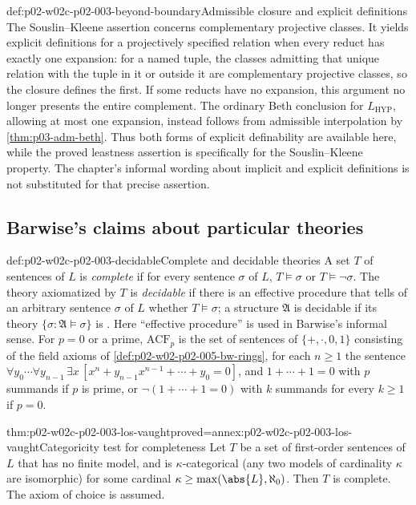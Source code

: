 \begin{hbconvention}{def:p02-w02c-p02-003-beyond-boundary}{Admissible closure and explicit definitions}
The Souslin--Kleene assertion concerns complementary projective classes.
It yields explicit definitions for a projectively specified relation
when every reduct has exactly one expansion: for a named tuple, the
classes admitting that unique relation with the tuple in it or outside
it are complementary projective classes, so the closure defines the
first. If some reducts have no expansion, this argument no longer
presents the entire complement. The ordinary Beth conclusion for
\(L_{\mathrm{HYP}}\), allowing at most one expansion, instead follows
from admissible interpolation by \cref{thm:p03-adm-beth}. Thus both
forms of explicit definability are available here, while the proved
leastness assertion is specifically for the Souslin--Kleene property.
The chapter's informal wording about implicit and explicit definitions
is not substituted for that precise assertion.
\end{hbconvention}

\subsection{Barwise's claims about particular theories}
\label{sec:p02-w02c-p02-003-theories}

\begin{hbdefinition}{def:p02-w02c-p02-003-decidable}{Complete and decidable theories}
A set \(T\) of sentences of \(L\) is \emph{complete} if for every sentence
\(\sigma\) of \(L\), \(T\models\sigma\) or \(T\models\neg\sigma\).  The
theory axiomatized by \(T\) is \emph{decidable} if there is an effective
procedure that tells of an arbitrary sentence \(\sigma\) of \(L\) whether
\(T\models\sigma\); a structure \(\mathfrak A\) is decidable if its theory
\(\{\sigma:\mathfrak A\models\sigma\}\) is
\cite[ch.~A.1, \S2, p.~16]{Barwise1977FirstOrder}.  Here ``effective
procedure'' is used in Barwise's informal sense.  For \(p=0\) or a prime,
\(\mathrm{ACF}_p\) is the set of sentences of \(\{+,\cdot,0,1\}\)
consisting of the field axioms of \cref{def:p02-w02-p02-005-bw-rings}, for
each \(n\geq1\) the sentence
\(\forall y_0\cdots\forall y_{n-1}\,\exists x\,
[x^n+y_{n-1}x^{n-1}+\cdots+y_0=0]\), and \(1+\cdots+1=0\) with \(p\)
summands if \(p\) is prime, or \(\neg(1+\cdots+1=0)\) with \(k\) summands for
every \(k\geq1\) if \(p=0\).
\end{hbdefinition}

\begin{hblemma}{thm:p02-w02c-p02-003-los-vaught}{proved=annex:p02-w02c-p02-003-los-vaught}{Categoricity test for completeness}
Let \(T\) be a set of first-order sentences of \(L\) that has no finite
model, and is \(\kappa\)-categorical (any two models of
cardinality \(\kappa\) are isomorphic) for some cardinal
\(\kappa\geq\max(\abs{L},\aleph_0)\).  Then \(T\) is complete.  The axiom
of choice is assumed.
\end{hblemma}

